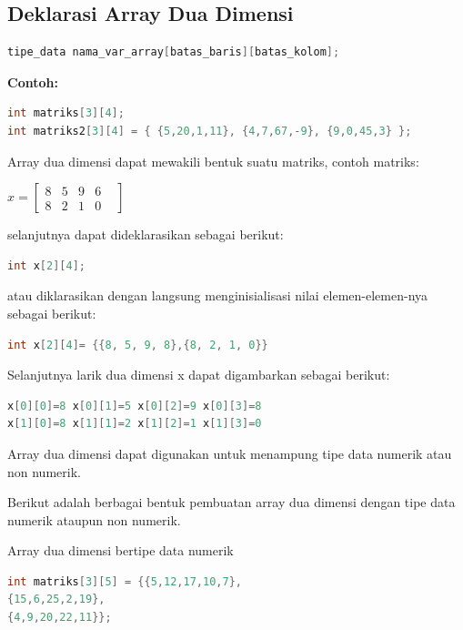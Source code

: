 \subsection{Deklarasi Array Dua Dimensi}\label{deklarasi-array-dua-dimensi}

\begin{lstlisting}[language=c++, numbers=none]
tipe_data nama_var_array[batas_baris][batas_kolom];
\end{lstlisting}

\textbf{Contoh:}

\begin{lstlisting}[language=c++, numbers=none]
int matriks[3][4];
int matriks2[3][4] = { {5,20,1,11}, {4,7,67,-9}, {9,0,45,3} };
\end{lstlisting}

Array dua dimensi dapat mewakili bentuk suatu matriks, contoh matriks:


$x=
\begin{bmatrix}
8 &5& 9 & 6 & \\
8 & 2 & 1 & 0
\end{bmatrix}$

selanjutnya dapat dideklarasikan sebagai berikut:

\begin{lstlisting}[language=c++]
int x[2][4];
\end{lstlisting}

atau diklarasikan dengan langsung menginisialisasi nilai
elemen-elemen-nya sebagai berikut:

\begin{lstlisting}[language=c++, numbers=none]
int x[2][4]= {{8, 5, 9, 8},{8, 2, 1, 0}}
\end{lstlisting}

Selanjutnya larik dua dimensi x dapat digambarkan sebagai berikut:

\begin{lstlisting}[language=c++, numbers=none]
x[0][0]=8 x[0][1]=5 x[0][2]=9 x[0][3]=8
x[1][0]=8 x[1][1]=2 x[1][2]=1 x[1][3]=0
\end{lstlisting}

Array dua dimensi dapat digunakan untuk menampung tipe data numerik atau
non numerik.

Berikut adalah berbagai bentuk pembuatan array dua dimensi dengan tipe
data numerik ataupun non numerik.

Array dua dimensi bertipe data numerik

\begin{lstlisting}[language=c++, numbers=none]
int matriks[3][5] = {{5,12,17,10,7},
{15,6,25,2,19},
{4,9,20,22,11}};
\end{lstlisting}

